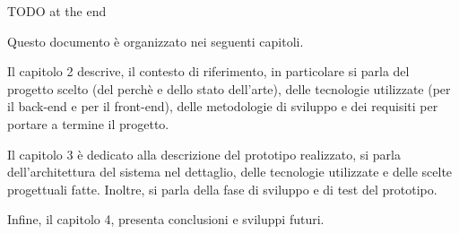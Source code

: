 TODO at the end\newline

Questo documento è organizzato nei seguenti capitoli.

Il capitolo 2 descrive, il contesto di riferimento, in particolare si parla del progetto scelto (del perchè e dello stato dell'arte), delle tecnologie utilizzate (per il back-end e per il front-end), delle metodologie di sviluppo e dei requisiti per portare a termine il progetto.


Il capitolo 3 è dedicato alla descrizione del prototipo realizzato, si parla dell'architettura del sistema nel dettaglio, delle tecnologie utilizzate e delle scelte progettuali fatte. Inoltre, si parla della fase di sviluppo e di test del prototipo.

Infine, il capitolo 4, presenta conclusioni e sviluppi futuri.
